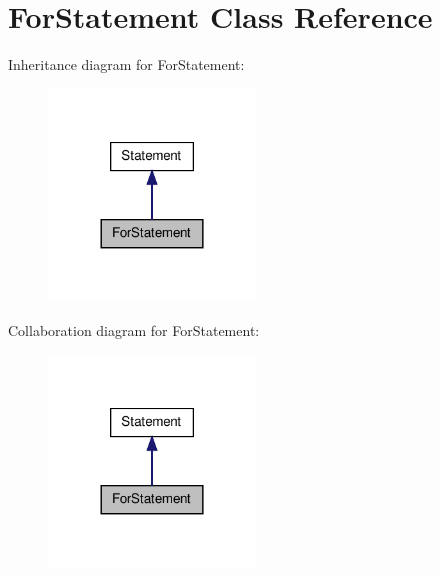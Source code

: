 \hypertarget{class_for_statement}{\section{For\-Statement Class Reference}
\label{class_for_statement}
}


Inheritance diagram for For\-Statement\-:
\nopagebreak
\begin{figure}[H]
\begin{center}
\leavevmode
\includegraphics[width=156pt]{class_for_statement__inherit__graph}
\end{center}
\end{figure}


Collaboration diagram for For\-Statement\-:
\nopagebreak
\begin{figure}[H]
\begin{center}
\leavevmode
\includegraphics[width=156pt]{class_for_statement__coll__graph}
\end{center}
\end{figure}
